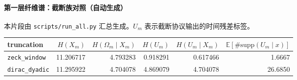 \paragraph{第一层纤维谱：截断族对照（自动生成）}
\AuditTag 本片段由 \texttt{scripts/run\_all.py} 汇总生成。$U_m$ 表示截断协议输出的时间残差标签。
\begin{center}
\small
\begin{tabular}{l r r r r r}
\toprule
truncation & $H(X_m)$ & $H(\Omega_m\mid X_m)$ & $H(U_m)$ & $H(U_m\mid X_m)$ & $\mathbb{E}[\#\mathrm{supp}(U_m\mid x)]$\\
\midrule
\texttt{zeck\_window} & 11.206717 & 4.793283 & 0.918291 & 0.617466 & 1.6667\\
\texttt{dirac\_dyadic} & 11.295922 & 4.704078 & 4.869079 & 4.704078 & 26.6850\\
\bottomrule
\end{tabular}
\end{center}

